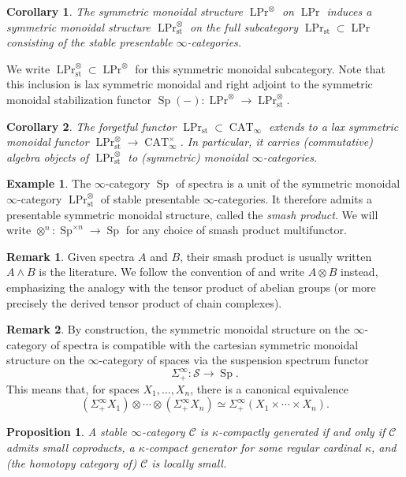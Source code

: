 \documentclass{article}
\newtheorem{corollary}{Corollary}[subsection]
\newtheorem{proposition}{Proposition}[subsection]
\theoremstyle{definition}
\newtheorem{example}{Example}[subsection]
\newtheorem{remark}{Remark}[subsection]
\newcommand{\C}{\mathcal{C}}
\renewcommand{\S}{\mathcal{S}}
\renewcommand{\i}{\infty}
\newcommand{\too}{\longrightarrow}
\DeclareMathOperator{\CAT}{CAT}
\DeclareMathOperator{\Prl}{LPr}
\DeclareMathOperator{\Sp}{Sp}
\newcommand{\st}{\mathrm{st}}
\begin{document}
\begin{corollary}
The symmetric monoidal structure $\Prl^\otimes$ on $\Prl$ induces a symmetric monoidal structure $\Prl^\otimes_{\st}$\index{$\Prl^\otimes_{\st}$} on the full subcategory $\Prl_\st\subset\Prl$ consisting of the stable presentable $\infty$-categories.
\end{corollary}
We write $\Prl_{\st}^\otimes\subset\Prl^\otimes$ for this symmetric monoidal subcategory.
Note that this inclusion is lax symmetric monoidal and right adjoint to the symmetric monoidal stabilization functor $\Sp(-):\Prl^\otimes\to\Prl^\otimes_{\st}$.
\begin{corollary}
The forgetful functor $\Prl_{\st}\subset\CAT_\i$ extends to a lax symmetric monoidal functor $\Prl_{\st}^\otimes\to\CAT_\i^\times$.
In particular, it carries (commutative) algebra objects of $\Prl_\st^\otimes$ to (symmetric) monoidal $\infty$-categories.
\end{corollary}
\begin{example}
The $\infty$-category $\Sp$ of spectra is a unit of the symmetric monoidal $\infty$-category $\Prl_{\st}^\otimes$ of stable presentable $\infty$-categories.
It therefore admits a presentable symmetric monoidal structure, called the {\em smash product}.
We will write ${\otimes}^n:\Sp^{\times n}\to\Sp$ for any choice of smash product multifunctor.
\end{example}
\begin{remark}
Given spectra $A$ and $B$, their smash product is usually written $A\land B$ is the literature.
We follow the convention of \cite{HA} and write $A\otimes B$ instead, emphasizing the analogy with the tensor product of abelian groups (or more precisely the derived tensor product of chain complexes).
\end{remark} 
\begin{remark}
By construction, the symmetric monoidal structure on the $\infty$-category of spectra is compatible with the cartesian symmetric monoidal structure on the $\infty$-category of spaces via the suspension spectrum functor\index{$\Sigma^\infty_+$}
\[
\Sigma^\infty_+:\S\too\Sp.
\]
This means that, for spaces $X_1,\ldots,X_n$, there is a canonical equivalence
\[
(\Sigma^\infty_+ X_1)\otimes\cdots\otimes(\Sigma^\infty_+ X_n)\simeq\Sigma^\infty_+(X_1\times\cdots\times X_n).
\]
\end{remark}


\begin{proposition}{\em \cite[Corollary 1.4.4.2]{HA}}
A stable $\infty$-category $\C$ is $\kappa$-compactly generated if and only if $\C$ admits small coproducts, a $\kappa$-compact generator for some regular cardinal $\kappa$, and (the homotopy category of) $\C$ is locally small.
\end{proposition}
\end{document}
